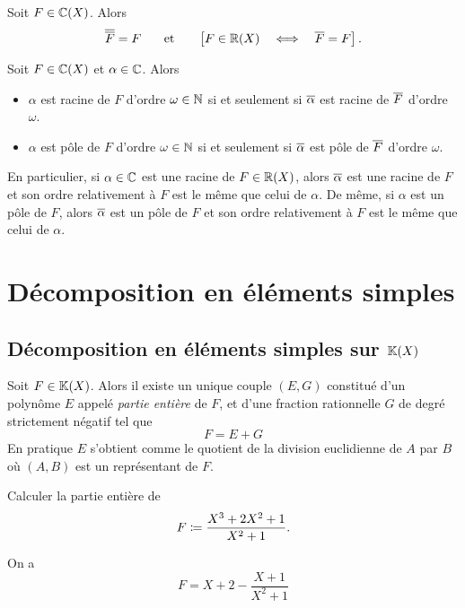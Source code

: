 \documentclass{magnolia}
\begin{document}
\begin{proposition}
Soit $F\in\fracC$. Alors
\[\conj{\conj{F}}=F \quad\et\quad \cro{F\in\fracR \quad\ssi\quad \conj{F}=F}.\]
\end{proposition}

\begin{proposition}
Soit $F\in\fracC$ et $\alpha\in\mathbb{C}$. Alors
\begin{itemize}
\item $\alpha$ est racine de $F$ d'ordre $\omega\in\mathbb{N}$ si et seulement si $\overline{\alpha}$ est racine de $\overline{F}$
   d'ordre $\omega$.
\item $\alpha$ est pôle de $F$ d'ordre $\omega\in\mathbb{N}$ si et seulement si $\overline{\alpha}$ est pôle de $\overline{F}$
   d'ordre $\omega$.
\end{itemize}
\end{proposition}

\begin{remarqueUnique}
\remarque En particulier, si $\alpha\in\mathbb{C}$ est une racine de $F\in\fracR$, alors $\overline{\alpha}$ est
  une racine de $F$ et son ordre relativement à $F$ est le même que celui de $\alpha$. De même, si $\alpha$
  est un pôle de $F$, alors $\overline{\alpha}$ est un pôle de $F$ et son ordre relativement à $F$ est le même
  que celui de $\alpha$.
\end{remarqueUnique}

\section{Décomposition en éléments simples}

\subsection{Décomposition en éléments simples sur $\fracK$}

\begin{definition}
Soit $F\in\fracK$. Alors il existe un unique couple
$(E,G)$ constitué d'un polynôme $E$ appelé \emph{partie entière} de $F$, et d'une
fraction rationnelle $G$ de degré strictement négatif tel que
\[F=E+G\]
En pratique $E$ s'obtient comme le quotient de la division euclidienne
de $A$ par $B$ où $(A,B)$ est un représentant de $F$. 
\end{definition}

\begin{exoUnique}
\exo Calculer la partie entière de
  \[F\coloneqq\frac{X^3+2X^2+1}{X^2+1}.\]
  \begin{sol}
  On a
  \[F=X+2-\frac{X+1}{X^2+1}\]
  \end{sol}
\end{exoUnique}
\end{document}
